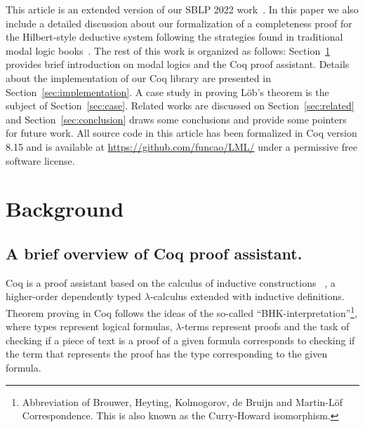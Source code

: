 \documentclass[3p,times]{elsarticle}
\begin{document}
This article is an extended version of our SBLP 2022 work~\cite{Silveira22}. In this paper we also include
a detailed discussion about our formalization of a completeness proof for the Hilbert-style deductive
system following the strategies found in traditional modal logic books~\cite{Blackburn-ModalLogics}.
The rest of this work is organized as follows: Section~\ref{sec:background} provides
brief introduction on modal logics and the Coq proof assistant. Details about
the implementation of our Coq library are presented in
Section~\ref{sec:implementation}. A case study in proving L\"ob's theorem is
the subject of Section~\ref{sec:case}. Related works are discussed
on Section~\ref{sec:related} and Section~\ref{sec:conclusion} draws some conclusions and
provide some pointers for future work.
%
All source code in this article has been formalized in Coq version 8.15 and
is available at \url{https://github.com/funcao/LML/} under a permissive free software license.

\section{Background}\label{sec:background}

\subsection{A brief overview of Coq proof assistant.}

Coq is a proof assistant based on the calculus of inductive
constructions ~\cite{manual_cic}, a higher-order dependently typed
$\lambda$-calculus extended with inductive definitions.  Theorem
proving in Coq follows the ideas of the so-called
``BHK-in\-ter\-pre\-ta\-tion''\footnote{Abbreviation of Brouwer, Heyting,
  Kolmogorov, de Bruijn and Martin-L\"of Correspondence. This is also
  known as the Curry-Howard isomorphism.}, where types represent
logical formulas, $\lambda$-terms represent proofs
\cite{Bertot10} and the task of checking if a piece of text is a
proof of a given formula corresponds to checking if the term that
represents the proof has the type corresponding to the given formula.
\end{document}
